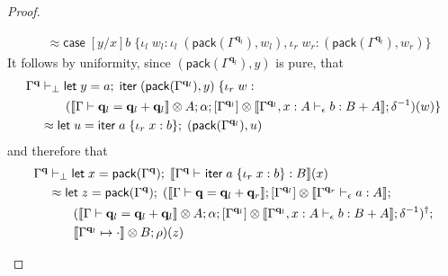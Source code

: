 \documentclass[acmsmall,screen,review]{acmart}
\newcommand{\mb}[1]{\ensuremath{\mathbf{#1}}}
\newcommand{\ms}[1]{\ensuremath{\mathsf{#1}}}
\newcommand{\lto}{:}
\newcommand{\linl}[1]{\iota_l\;{#1}}
\newcommand{\linr}[1]{\iota_r\;{#1}}
\newcommand{\letexpr}[3]{\ensuremath{\ms{let}\;#1 = #2;\;#3}}
\newcommand{\caseexpr}[5]{\ms{case}\;#1\;\{\linl{#2} \lto #3, \linr{#4} \lto #5\}}
\newcommand{\liter}[3]{\ms{iter}\;#1\;\{ \linr{#2} \lto #3 \}}
\newcommand{\qsp}[4]{#1 \vdash #2 = #3 + #4}
\newcommand{\cwk}[2]{#1 \mapsto #2}
\newcommand{\hasty}[4]{#1 \vdash_{#2} #3: {#4}}
\newcommand{\dnt}[1]{\llbracket{#1}\rrbracket}
\begin{document}
\begin{proof}
\begin{itemize}
\begin{align*}
      &\approx
      \caseexpr{[y/x]b}{w_l}{\linl{(\ms{pack}(\Gamma^{\mb{q}_l}), w_l)}}
                       {w_r}{(\ms{pack}(\Gamma^{\mb{q}_l}), w_r)}
    \end{align*}
    It follows by uniformity, since $(\ms{pack}(\Gamma^{\mb{q}_l}), y)$ is pure, that
    \begin{align*}
      \Gamma^{\mb{q}} &\vdash_\bot
      \letexpr{y}{a}{\liter{(\ms{pack}(\Gamma^{\mb{q}_l}), y)}{w}{ \\ & \qquad
        (
          \dnt{\qsp{\Gamma}{\mb{q}_l}{\mb{q}_l}{\mb{q}_l}} \otimes A 
          ; \alpha
          ; [\Gamma^{\mb{q}_l}] 
            \otimes \dnt{\hasty{\Gamma^{\mb{q}_l}, x : A}{\epsilon}{b}{B + A}}
          ; \delta^{-1}
        )(w)
      }} \\
      &\approx
      \letexpr{u}{\liter{a}{x}{b}}{(\ms{pack}(\Gamma^{\mb{q}_l}), u)}
    \end{align*}
    and therefore that
    \begin{align*}
    \Gamma^{\mb{q}} &\vdash_\bot
      \letexpr{x}{\ms{pack}(\Gamma^{\mb{q}})}{\dnt{\hasty{\Gamma^{\mb{q}}}{}{\liter{a}{x}{b}}{B}}(x)}
      \\ &\approx 
      \letexpr{z}{\ms{pack}(\Gamma^{\mb{q}})}
        {(
          \dnt{\qsp{\Gamma}{\mb{q}}{\mb{q}_l}{\mb{q}_r}}
          ; [\Gamma^{\mb{q}_l}] \otimes \dnt{\hasty{\Gamma^{\mb{q}_r}}{\epsilon}{a}{A}}
          ;
      \\ & \qquad    
        (
          \dnt{\qsp{\Gamma}{\mb{q}_l}{\mb{q}_l}{\mb{q}_l}} \otimes A 
          ; \alpha
          ; [\Gamma^{\mb{q}_l}] 
            \otimes \dnt{\hasty{\Gamma^{\mb{q}_l}, x : A}{\epsilon}{b}{B + A}}
          ; \delta^{-1}
        )^\dagger  
        ;
      \\ & \qquad
        \dnt{\cwk{\Gamma^{\mb{q}_l}}{\cdot}} \otimes B
        ; \rho
      )(z)}

\end{align*}
\end{itemize}
\end{proof}
\end{document}
